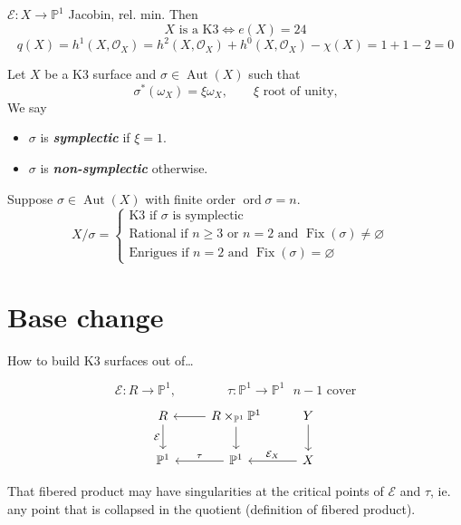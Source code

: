 \begin{prop}
	$\mathcal{E}:X\to \mathbb{P}^1$ Jacobin, rel. min. Then
	\[X \text{ is a K3}\iff e(X)=24 \]
	\[q(X)= h^{1}(X,\mathcal{O}_X)=h^{2}(X,\mathcal{O}_X)+h^{0}(X,\mathcal{O}_X)-\chi(X)=1+1-2=0\]
\end{prop}

\begin{defn}
Let $X$ be a K3 surface and $\sigma\in\operatorname{Aut}(X)$ such that
\[\sigma ^*(\omega_X)=\xi \omega_X,\qquad \xi \text{ root of unity,} \]
We say 
\begin{itemize}
\item $\sigma$ is \textit{\textbf{symplectic}} if $\xi =1$.
\item $\sigma$ is \textit{\textbf{non-symplectic}} otherwise.
\end{itemize}

Suppose $\sigma\in\operatorname{Aut}(X)$ with finite order $\operatorname{ord}\sigma=n$.
\[X/\sigma=\begin{cases}
	\text{K3 if $\sigma$ is symplectic}\\
	\text{Rational if $n\geq 3$ or $n=2$ and $\operatorname{Fix}(\sigma)\neq \varnothing $}\\
	\text{Enrigues if $n=2$ and $\operatorname{Fix}(\sigma)=\varnothing $} 
	\qquad &
\end{cases}\]
\end{defn}

\section{Base change}

How to build K3 surfaces out of…

\[\mathcal{E}:R\to \mathbb{P}^1,\qquad \qquad \tau :\mathbb{P}^1\to \mathbb{P}^1 \text{ $n-1$ cover} \]
\[\begin{tikzcd}
	R\arrow[d,"\mathcal{E}",swap]& R\times_{\mathbb{P}^1}\mathbb{P}^1\arrow[l]\arrow[d]& Y\arrow[d]\\
	\mathbb{P}^1&\mathbb{P}^1\arrow[l,"\tau ",swap]& X\arrow[l,swap,"\mathcal{E}_X"]
\end{tikzcd}\]

\begin{remark}[Sergey]\leavevmode
	That fibered product may have singularities at the critical points of $\mathcal{E}$ and $\tau$, ie. any point that is collapsed in the quotient (definition of fibered product).
\end{remark}

